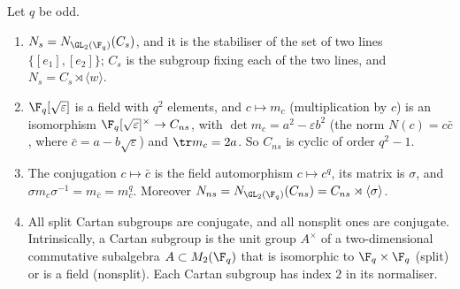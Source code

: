 \begin{proposition}\label{prop:groups:cartan}
Let $q$ be odd.
\begin{enumerate}[label=(\roman*)]
\item $N_s=N_{\GL_2(\F_q)}(C_s)$, and it is the stabiliser of the set of two lines $\{[e_1],[e_2]\}$; $C_s$ is the subgroup fixing each of the two lines, and
$N_s=C_s\rtimes\langle w\rangle$.
\item $\F_q[\sqrt\varepsilon]$ is a field with $q^2$ elements, and $c\mapsto m_c$ (multiplication by $c$) is an isomorphism $\F_q[\sqrt\varepsilon]^\times\to C_{ns}$, with
$\det m_c=a^2-\varepsilon b^2$ (the norm $N(c)=c\bar c$, where $\bar c=a-b\sqrt\varepsilon$) and $\tr m_c=2a$. So $C_{ns}$ is cyclic of order $q^2-1$.
\item The conjugation $c\mapsto\bar c$ is the field automorphism $c\mapsto c^q$, its matrix is $\sigma$, and $\sigma m_c\sigma^{-1}=m_{\bar c}=m_c^q$. Moreover
$N_{ns}=N_{\GL_2(\F_q)}(C_{ns})=C_{ns}\rtimes\langle\sigma\rangle$.
\item All split Cartan subgroups are conjugate, and all nonsplit ones are conjugate. Intrinsically, a Cartan subgroup is the unit group $A^\times$ of a
two-dimensional commutative subalgebra $A\subset M_2(\F_q)$ that is isomorphic to $\F_q\times\F_q$ (split) or is a field (nonsplit). Each Cartan subgroup has
index $2$ in its normaliser.
\end{enumerate}
\end{proposition}

